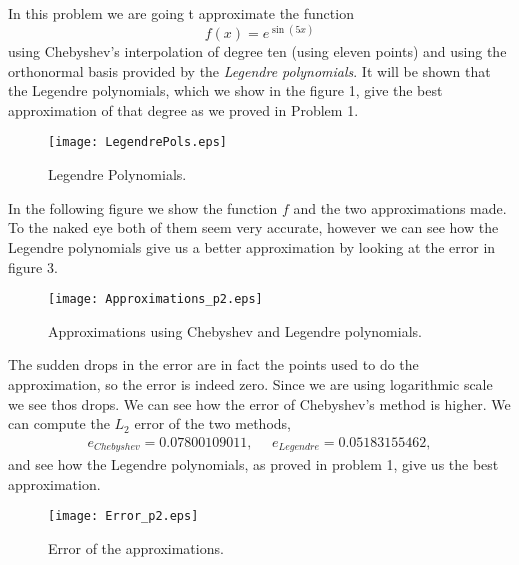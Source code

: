 In this problem we are going t approximate the function 
$$ f(x)=e^{\sin(5x)}$$
using Chebyshev's interpolation of degree ten (using eleven points) and using the orthonormal basis provided by the \textit{Legendre polynomials}. It will be shown that the Legendre polynomials, which we show in the figure 1, give the best approximation of that degree as we proved in Problem 1.

\begin{figure}[H]
\centering     %
{\texttt{[image: LegendrePols.eps]}}
\caption{Legendre Polynomials.}
\end{figure}

In the following figure we show the function $f$ and the two approximations made. To the naked eye both of them seem very accurate, however we can see how the Legendre polynomials give us a better approximation by looking at the error in figure 3. 
\begin{figure}[H]
\centering     %
{\texttt{[image: Approximations\_p2.eps]}}
\caption{Approximations using Chebyshev and Legendre polynomials.}
\end{figure}
The sudden drops in the error are in fact the points used to do the approximation, so the error is indeed zero. Since we are using logarithmic scale we see thos drops. We can see how the error of Chebyshev's method is higher. We can compute the $L_2$ error of the two methods,
\begin{align*}
e_{Chebyshev}=0.07800109011,~~~~~~e_{Legendre}=0.05183155462,
\end{align*}
and see how the Legendre polynomials, as proved in problem 1, give us the best approximation.
\begin{figure}[H]
\centering     %
{\texttt{[image: Error\_p2.eps]}}
\caption{Error of the approximations.}
\end{figure}
